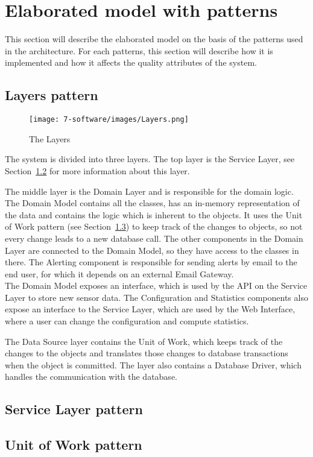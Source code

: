 
\clearpage
\section{Elaborated model with patterns}
This section will describe the elaborated model on the basis of the patterns used in the architecture. For each patterns, this section will describe how it is implemented and how it affects the quality attributes of the system.

\subsection{Layers pattern}
\begin{figure}[H]
\centering
\texttt{[image: 7-software/images/Layers.png]}
\caption{The Layers}
\label{fig:layers}
\end{figure}
The system is divided into three layers. The top layer is the Service Layer, see Section~\ref{sec:service-layer-pattern} for more information about this layer.

The middle layer is the Domain Layer and is responsible for the domain logic. The Domain Model contains all the classes, has an in-memory representation of the data and contains the logic which is inherent to the objects.
It uses the Unit of Work pattern (see Section~\ref{sec:unit-of-work-pattern}) to keep track of the changes to objects, so not every change leads to a new database call. 
The other components in the Domain Layer are connected to the Domain Model, so they have access to the classes in there. 
The Alerting component is responsible for sending alerts by email to the end user, for which it depends on an external Email Gateway.\\
The Domain Model exposes an interface, which is used by the API on the Service Layer to store new sensor data. The Configuration and Statistics components also expose an interface to the Service Layer, which are used by the Web Interface, where a user can change the configuration and compute statistics.

The Data Source layer contains the Unit of Work, which keeps track of the changes to the objects and translates those changes to database transactions when the object is committed. The layer also contains a Database Driver, which handles the communication with the database.



\subsection{Service Layer pattern}
\label{sec:service-layer-pattern}

\subsection{Unit of Work pattern}
\label{sec:unit-of-work-pattern}



